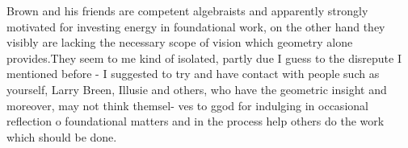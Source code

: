 \margin{\unsure{=}}
Brown and his friends are competent algebraists and apparently strongly
motivated for investing energy in foundational work,  on the other hand
they visibly are lacking the necessary scope of vision which geometry
alone provides.They seem to me kind of isolated,  partly due I guess to
the disrepute I mentioned before  -  I suggested to try and have contact
with people such as yourself, Larry Breen, Illusie and others,  who have
the geometric insight  and  moreover,  may not think themsel-%
ves to ggod for indulging in occasional reflection o foundational matters\hand{,}
and in the process help others do the work which should be done.

